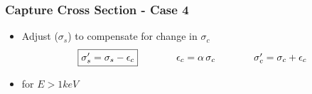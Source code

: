 \begin{frame}
\frametitle{Capture Cross Section - Case 4}
\begin{itemize}
  \item Adjust  ($\sigma_s$) to compensate for change in $\sigma_c$
	\begin{equation*}
	\begin{array}{ccc}
	\boxed{\sigma'_s = \sigma_s - \epsilon_c}\hspace{0.4in} &  \epsilon_c = \alpha\,\sigma_c &\hspace{0.4in} \sigma'_c = \sigma_c + \epsilon_c%
	\end{array}
	\end{equation*}
	\item {} {for} $E>1 keV$
\end{itemize} 

\begin{table}[h!] 
	\vspace{-0.1in}
  \begin{center}
  \end{center}
\end{table}

\end{frame} 


